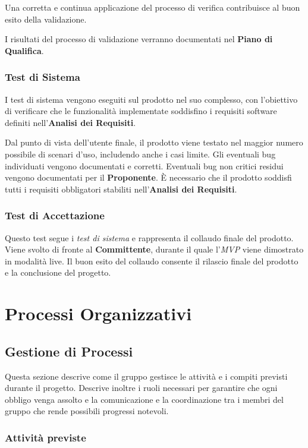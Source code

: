 \documentclass[12pt, a4paper]{article}
\begin{document}
Una corretta e continua applicazione del processo di verifica contribuisce al buon esito della validazione.

I risultati del processo di validazione verranno documentati nel \textbf{Piano di Qualifica}.

\subsubsection{Test di Sistema}

I test di sistema vengono eseguiti sul prodotto nel suo complesso, con l'obiettivo di verificare che le funzionalità implementate soddisfino i requisiti software definiti nell'\textbf{Analisi dei Requisiti}.

Dal punto di vista dell'utente finale, il prodotto viene testato nel maggior numero possibile di scenari d'uso, includendo anche i casi limite. Gli eventuali bug individuati vengono documentati e corretti. Eventuali bug non critici residui vengono documentati per il \textbf{Proponente}. È necessario che il prodotto soddisfi tutti i requisiti obbligatori stabiliti nell'\textbf{Analisi dei Requisiti}.

\subsubsection{Test di Accettazione}

Questo test segue i \textit{test di sistema} e rappresenta il collaudo finale del prodotto. Viene svolto di fronte al \textbf{Committente}, durante il quale l'\textit{MVP} viene dimostrato in modalità live. Il buon esito del collaudo consente il rilascio finale del prodotto e la conclusione del progetto.

\newpage
\section{Processi Organizzativi}

\subsection{Gestione di Processi}

Questa sezione descrive come il gruppo gestisce le attività e i compiti previsti durante il progetto. Descrive inoltre i ruoli necessari per garantire che ogni obbligo venga assolto e la comunicazione e la coordinazione tra i membri del gruppo che rende possibili progressi notevoli.

\subsubsection{Attività previste}
\end{document}
